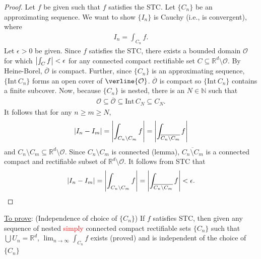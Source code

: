 \documentclass{article}
\theoremstyle{definition}
\begin{document}
\begin{proof}
Let $f$ be given such that $f$ satisfies the STC. Let $\{C_n\}$ be an approximating sequence. We want to show $\{ I_n \}$ is Cauchy (i.e., is convergent), where
\begin{align*}
    I_n = \int_{C_n}f.
\end{align*}
Let $ \epsilon > 0$ be given. Since $f$ satisfies the STC, there exists a bounded domain $\mathcal{O}$ for which $\abs{\int_C f} < \epsilon$ for any connected compact rectifiable set $C \subseteq \mathbb{R}^d\setminus\mathcal{O}$. By Heine-Borel, $\overline{\mathcal{O}}$ is compact. Further, since $\{ C_n \}$ is an approximating sequence, $\{ \mbox{Int}\,C_n \}$ forms an open cover of $\verline{\mathcal{O}}$. $\overline{\mathcal{O}}$ is compact so $\{ \text{Int}\,C_n\}$ contains a finite subcover. Now, because $\{C_n \}$ is nested, there is an $N\in\mathbb{N}$ such that 
\begin{align*}
    \mathcal{O} \subseteq \overline{\mathcal{O}} \subseteq \text{Int}\,C_N \subseteq C_N.
\end{align*}
It follows that for any $n\geq m\geq N$,
\begin{align*}
    \abs{I_n - I_m} = \abs{\int_{C_n\setminus C_m} f} = \abs{\int_{\overline{C_n\setminus C_m}} f}
\end{align*}
and $C_n\setminus C_m \subseteq \mathbb{R}^d\setminus \mathcal{O}$. Since $C_n\setminus C_m$ is connected (lemma), $\overline{C_n\setminus C_m}$ is a connected compact and rectifiable subset of $\mathbb{R}^d\setminus \mathcal{O}$. It follows from STC that 
\begin{align*}
    \abs{I_n - I_m} = \abs{\int_{C_n\setminus C_m} f} = \abs{\int_{\overline{C_n\setminus C_m}} f} < \epsilon.
\end{align*}
 





\end{proof}









\noindent \underline{To prove}: (Independence of choice of $\{C_n\}$) If $f$ satisfies STC, then given any sequence of nested \textcolor{red}{simply} connected compact rectifiable sets $\{C_n \}$ such that $\bigcup U_n = \mathbb{R}^d$, $\lim_{n\to \infty}\int_{C_n} f$ exists (proved) and is independent of the choice of $\{C_n \}$
\end{document}
